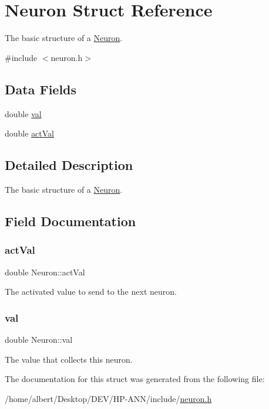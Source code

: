 \hypertarget{structNeuron}{}\section{Neuron Struct Reference}
\label{structNeuron}


The basic structure of a \hyperlink{structNeuron}{Neuron}.  




{\ttfamily \#include $<$neuron.\+h$>$}

\subsection*{Data Fields}
\begin{DoxyCompactItemize}
\item 
double \hyperlink{structNeuron_ac3093a71eb817e3b91ec4210707b0602}{val}
\item 
double \hyperlink{structNeuron_a11871bae6838438e083a6ecd2e611870}{act\+Val}
\end{DoxyCompactItemize}


\subsection{Detailed Description}
The basic structure of a \hyperlink{structNeuron}{Neuron}. 

\subsection{Field Documentation}
\mbox{\label{structNeuron_a11871bae6838438e083a6ecd2e611870}} 
\subsubsection{\texorpdfstring{act\+Val}{actVal}}
{\footnotesize\ttfamily double Neuron\+::act\+Val}

The activated value to send to the next neuron. \mbox{\label{structNeuron_ac3093a71eb817e3b91ec4210707b0602}} 
\subsubsection{\texorpdfstring{val}{val}}
{\footnotesize\ttfamily double Neuron\+::val}

The value that collects this neuron. 

The documentation for this struct was generated from the following file\+:\begin{DoxyCompactItemize}
\item 
/home/albert/\+Desktop/\+D\+E\+V/\+H\+P-\/\+A\+N\+N/include/\hyperlink{neuron_8h}{neuron.\+h}\end{DoxyCompactItemize}
